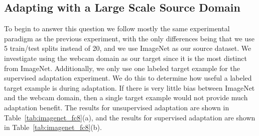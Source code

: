 





\subsection{Adapting with a Large Scale Source Domain}

To begin to answer this question we follow mostly the same experimental paradigm as the previous experiment, with the only differences being that we use 5 train/test splits instead of 20, and we use ImageNet as our source dataset.
We investigate using the webcam domain as our target since it is the most distinct from ImageNet. 
Additionally, we only use one labeled target example for the supervised adaptation experiment. We do this to determine how useful a labeled target example is during adaptation. If there is very little bias between ImageNet and the webcam domain, then a single target example would not provide much adaptation benefit.
The results for unsupervised adaptation are shown in Table~\ref{tab:imagenet_fc8}(a), and the results for supervised adaptation are shown in Table~\ref{tab:imagenet_fc8}(b). %


